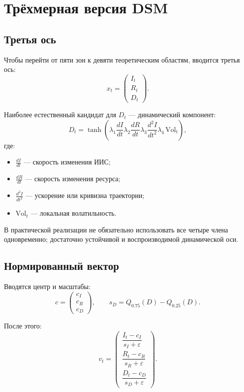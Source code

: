 \documentclass[12pt,a4paper]{article}
\begin{document}
\section{Трёхмерная версия DSM}
\subsection{Третья ось}
Чтобы перейти от пяти зон к девяти теоретическим областям, вводится третья ось:
\begin{equation}
x_t=
\begin{pmatrix}
I_t\\
R_t\\
D_t
\end{pmatrix}.
\end{equation}

Наиболее естественный кандидат для $D_t$ --- динамический компонент:
\begin{equation}
D_t=
\tanh\!\left(
\lambda_1 \frac{dI}{dt}
\lambda_2 \frac{dR}{dt}
\lambda_3 \frac{d^2I}{dt^2}
\lambda_4 \,\mathrm{Vol}_t
\right),
\end{equation}
где:
\begin{itemize}[leftmargin=1.25cm]
    \item $\frac{dI}{dt}$ --- скорость изменения ИИС;
    \item $\frac{dR}{dt}$ --- скорость изменения ресурса;
    \item $\frac{d^2I}{dt^2}$ --- ускорение или кривизна траектории;
    \item $\mathrm{Vol}_t$ --- локальная волатильность.
\end{itemize}

В практической реализации не обязательно использовать все четыре члена одновременно; достаточно устойчивой и воспроизводимой динамической оси.

\subsection{Нормированный вектор}
Вводятся центр и масштабы:
\begin{equation}
c=
\begin{pmatrix}
c_I\\
c_R\\
c_D
\end{pmatrix},
\qquad
s_D=Q_{0.75}(D)-Q_{0.25}(D).
\end{equation}

После этого:
\begin{equation}
v_t=
\begin{pmatrix}
\dfrac{I_t-c_I}{s_I+\varepsilon}\\[8pt]
\dfrac{R_t-c_R}{s_R+\varepsilon}\\[8pt]
\dfrac{D_t-c_D}{s_D+\varepsilon}
\end{pmatrix}.
\end{equation}
\end{document}
